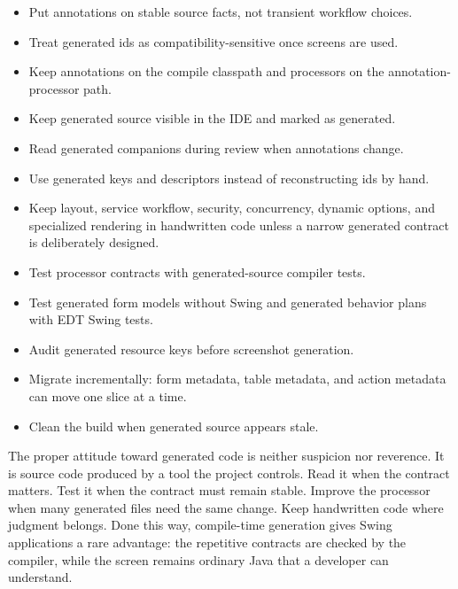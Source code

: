 \begin{itemize}
\item Put annotations on stable source facts, not transient workflow choices.
\item Treat generated ids as compatibility-sensitive once screens are used.
\item Keep annotations on the compile classpath and processors on the
annotation-processor path.
\item Keep generated source visible in the IDE and marked as generated.
\item Read generated companions during review when annotations change.
\item Use generated keys and descriptors instead of reconstructing ids by hand.
\item Keep layout, service workflow, security, concurrency, dynamic options,
and specialized rendering in handwritten code unless a narrow generated
contract is deliberately designed.
\item Test processor contracts with generated-source compiler tests.
\item Test generated form models without Swing and generated behavior plans
with EDT Swing tests.
\item Audit generated resource keys before screenshot generation.
\item Migrate incrementally: form metadata, table metadata, and action
metadata can move one slice at a time.
\item Clean the build when generated source appears stale.
\end{itemize}

The proper attitude toward generated code is neither suspicion nor reverence.
It is source code produced by a tool the project controls. Read it when the
contract matters. Test it when the contract must remain stable. Improve the
processor when many generated files need the same change. Keep handwritten
code where judgment belongs. Done this way, compile-time generation gives
Swing applications a rare advantage: the repetitive contracts are checked by
the compiler, while the screen remains ordinary Java that a developer can
understand.
